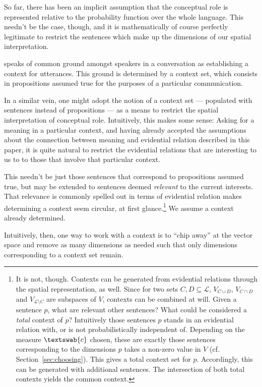 \documentclass[11pt, a4paper]{scrartcl}
\renewcommand{\i}[1]{\emph{#1}}
\renewcommand{\L}{\mathcal{L}}
\newcommand{\m}[1]{\textswab{#1}}
\begin{document}
So far, there has been an implicit assumption that the conceptual role is represented relative to the probability function over the whole language. This needn't be the case, though, and it is mathematically of course perfectly legitimate to restrict the sentences which make up the dimensions of our spatial interpretation. 

\textcite{Stalnaker1978-STAA-2} speaks of common ground amongst speakers in a conversation as establishing a context for utterances. This ground is determined by a context set, which consists in propositions assumed true for the purposes of a particular communication.

In a similar vein, one might adopt the notion of a context set --- populated with sentences instead of propositions --- as a means to restrict the spatial interpretation of conceptual role. Intuitively, this makes some sense: Asking for a meaning in a particular context, and having already accepted the assumptions about the connection between meaning and evidential relation described in this paper, it is quite natural to restrict the evidential relations that are interesting to us to to those that involve that particular context.

This needn't be just those sentences that correspond to propositions assumed true, but may be extended to sentences deemed \i{relevant} to the current interests. That relevance is commonly spelled out in terms of evidential relation makes determining a context seem circular, at first glance.\footnote{It is not, though. Contexts can be generated from evidential relations through the spatial representation, as well. Since for two sets $C, D \subseteq \L$, $V_{C\cup D}$, $V_{C\cap D}$ and $V_{\L\setminus C}$ are subspaces of $V$, contexts can be combined at will. Given a sentence $p$, what are relevant other sentences? What could be considered a \i{total} context of $p$? Intuitively those sentences $p$ stands in an evidential relation with, or is not probabilistically independent of. Depending on the measure $\m{c}$ chosen, these are exactly those sentences corresponding to the dimensions $p$ takes a non-zero value in $V$ (cf. Section~\ref{sec:choosing}). This gives a total context set for $p$. Accordingly, this can be generated with additional sentences. The intersection of both total contexts yields the common context.} We assume a context already determined.

Intuitively, then, one way to work with a context is to ``chip away'' at the vector space and remove as many dimensions as needed such that only dimensions corresponding to a context set remain.
\end{document}
